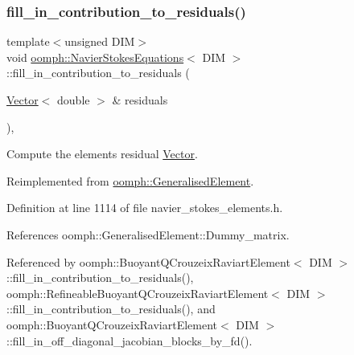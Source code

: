 \mbox{\label{classoomph_1_1NavierStokesEquations_a314875a11bafbf24d6a84df31e0213e8}} 
\subsubsection{\texorpdfstring{fill\+\_\+in\+\_\+contribution\+\_\+to\+\_\+residuals()}{fill\_in\_contribution\_to\_residuals()}}
{\footnotesize\ttfamily template$<$unsigned D\+IM$>$ \\
void \hyperlink{classoomph_1_1NavierStokesEquations}{oomph\+::\+Navier\+Stokes\+Equations}$<$ D\+IM $>$\+::fill\+\_\+in\+\_\+contribution\+\_\+to\+\_\+residuals (\begin{DoxyParamCaption}\item[{\hyperlink{classoomph_1_1Vector}{Vector}$<$ double $>$ \&}]{residuals }\end{DoxyParamCaption})\hspace{0.3cm}{\ttfamily [inline]}, {\ttfamily [virtual]}}



Compute the element\textquotesingle{}s residual \hyperlink{classoomph_1_1Vector}{Vector}. 



Reimplemented from \hyperlink{classoomph_1_1GeneralisedElement_a310c97f515e8504a48179c0e72c550d7}{oomph\+::\+Generalised\+Element}.



Definition at line 1114 of file navier\+\_\+stokes\+\_\+elements.\+h.



References oomph\+::\+Generalised\+Element\+::\+Dummy\+\_\+matrix.



Referenced by oomph\+::\+Buoyant\+Q\+Crouzeix\+Raviart\+Element$<$ D\+I\+M $>$\+::fill\+\_\+in\+\_\+contribution\+\_\+to\+\_\+residuals(), oomph\+::\+Refineable\+Buoyant\+Q\+Crouzeix\+Raviart\+Element$<$ D\+I\+M $>$\+::fill\+\_\+in\+\_\+contribution\+\_\+to\+\_\+residuals(), and oomph\+::\+Buoyant\+Q\+Crouzeix\+Raviart\+Element$<$ D\+I\+M $>$\+::fill\+\_\+in\+\_\+off\+\_\+diagonal\+\_\+jacobian\+\_\+blocks\+\_\+by\+\_\+fd().

